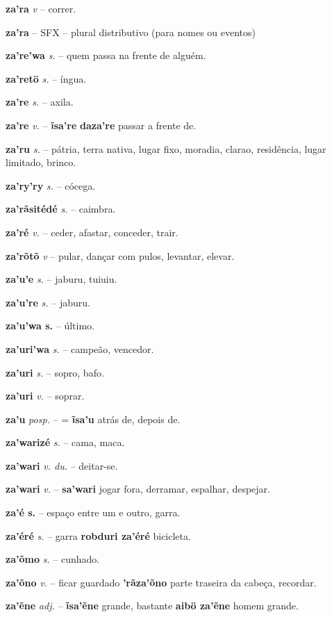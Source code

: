 \textbf{za'ra} \textit{v} -- {correr}.

\textbf{za'ra} -- {SFX} -- {plural distributivo (para nomes ou eventos)}

\textbf{za're'wa} \textit{s.} -- quem passa na frente de alguém.

\textbf{za'retö} \textit{s.} -- íngua.

\textbf{za're} \textit{s.} -- axila.

\textbf{za're} \textit{v.} -- \textbf{ĩsa're} \textbf{daza're} passar a frente de.

\textbf{za'ru} \textit{s.} -- pátria, terra nativa, lugar fixo, moradia, clarao, residência, lugar limitado, brinco.

\textbf{za'ry'ry} \textit{s.} -- cócega.

\textbf{za'rãsitédé} \textit{s.} -- caimbra.

\textbf{za'ré} \textit{v.} -- ceder, afastar, conceder, trair.

\textbf{za'rõtõ} \textit{v} -- pular, dançar com pulos, levantar, elevar.

\textbf{za'u'e} \textit{s.} -- jaburu, tuiuiu.

\textbf{za'u're} \textit{s.} -- jaburu.

\textbf{za'u'wa s.} -- último.

\textbf{za'uri'wa} \textit{s.} -- campeão, vencedor.

\textbf{za'uri} \textit{s.} -- sopro, bafo.

\textbf{za'uri} \textit{v.} -- soprar.

\textbf{za'u} \textit{posp.} -- = \textbf{ĩsa'u} atrás de, depois de.

\textbf{za'warizé} \textit{s.} -- cama, maca.

\textbf{za'wari} \textit{v. du.} -- deitar-se.

\textbf{za'wari} \textit{v.} -- \textbf{sa'wari} jogar fora, derramar, espalhar, despejar.

\textbf{za'é s.} -- espaço entre um e outro, garra.

\textbf{za'éré} \textit{s.} -- garra  \textbf{robduri za'éré} bicicleta.

\textbf{za'õmo} \textit{s.} -- cunhado.

\textbf{za'õno} \textit{v.} -- ficar guardado  \textbf{'rãza'õno} parte traseira da cabeça, recordar.

\textbf{za'ẽne} \textit{adj.} -- \textbf{ĩsa'ẽne} grande, bastante  \textbf{aibö za'ẽne} homem grande.

